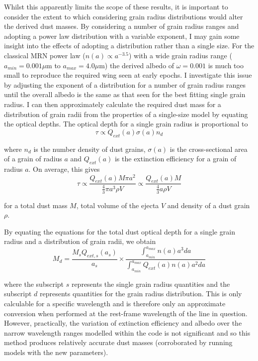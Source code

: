 Whilst this apparently limits the scope of these results, it is important to consider the extent to which considering grain radius distributions would alter the derived dust masses.  By considering a number of grain radius ranges and adopting a power law distribution with a variable exponent, I may gain some insight into the effects of adopting a distribution rather than a single size.  For the classical MRN power law ($n(a) \propto a^{-3.5}$) with a wide grain radius range ($a_{min} = 0.001 \mu$m to $a_{max} = 4.0 \mu$m) the derived albedo of $\omega=0.001$ is much too small to reproduce the required wing seen at early epochs.  I investigate this issue by adjusting the exponent of a distribution for a number of grain radius ranges until the overall albedo is the same as that seen for the best fitting single grain radius.  I can then approximately calculate the required dust mass for a distribution of grain radii from the properties of a single-size model by equating the optical depths.  The optical depth for a single grain radius is proportional to 
\begin{equation}
\tau \propto Q_{ext}(a)  \sigma(a) n_d
\end{equation}

\noindent where $n_d$ is the number density of dust grains, $\sigma(a)$ is the cross-sectional area of a grain of radius $a$ and $Q_{ext}(a)$ is the extinction efficiency for a grain of radius $a$.  On average, this gives
\begin{equation}
\tau \propto \frac{Q_{ext}(a) M \pi a^2}{\frac{4}{3} \pi a^3 \rho V} \propto \frac{Q_{ext}(a) M}{\frac{4}{3} a \rho V}
\end{equation}

\noindent for a total dust mass $M$, total volume of the ejecta $V$ and density of a dust grain $\rho$.

By equating the equations for the total dust optical depth for a single grain radius and a distribution of grain radii, we obtain 
\begin{equation}
\label{distn_conv}
M_{d}= \frac{M_s Q_{ext,s}(a_s)}{a_s} \times \frac{\int^{a_{max}}_{a_{min}} n(a) a^3 da}{\int^{a_{max}}_{a_{min}} Q_{ext}(a) n(a) a^2 da}
\end{equation}

where the subscript $s$ represents the single grain radius quantities and the subscript  $d$ represents quantities for the grain radius distribution.  This is only calculable for a specific wavelength and is therefore only an approximate conversion when performed at the rest-frame wavelength of the line in question.  However, practically, the variation of extinction efficiency and albedo over the narrow wavelength ranges modelled within the code is not significant and so this method produces relatively accurate dust masses (corroborated by running models with the new parameters).

